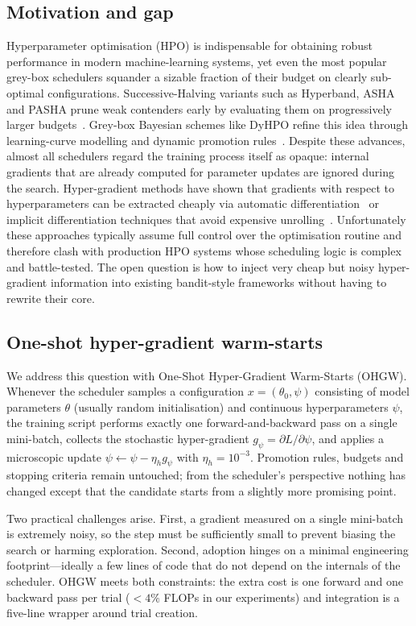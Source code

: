\documentclass{article} %
\begin{document}
\subsection{Motivation and gap}
Hyperparameter optimisation (HPO) is indispensable for obtaining robust performance in modern machine-learning systems, yet even the most popular grey-box schedulers squander a sizable fraction of their budget on clearly sub-optimal configurations. Successive-Halving variants such as Hyperband, ASHA and PASHA prune weak contenders early by evaluating them on progressively larger budgets~\cite{bohdal-2022-pasha}. Grey-box Bayesian schemes like DyHPO refine this idea through learning-curve modelling and dynamic promotion rules~\cite{wistuba-2022-supervising}. Despite these advances, almost all schedulers regard the training process itself as opaque: internal gradients that are already computed for parameter updates are ignored during the search. Hyper-gradient methods have shown that gradients with respect to hyperparameters can be extracted cheaply via automatic differentiation~\cite{chandra-2019-gradient} or implicit differentiation techniques that avoid expensive unrolling~\cite{bertrand-2020-implicit}. Unfortunately these approaches typically assume full control over the optimisation routine and therefore clash with production HPO systems whose scheduling logic is complex and battle-tested. The open question is how to inject very cheap but noisy hyper-gradient information into existing bandit-style frameworks without having to rewrite their core.

\subsection{One-shot hyper-gradient warm-starts}
We address this question with One-Shot Hyper-Gradient Warm-Starts (OHGW). Whenever the scheduler samples a configuration \(x=(\theta_0,\psi)\) consisting of model parameters \(\theta\) (usually random initialisation) and continuous hyperparameters \(\psi\), the training script performs exactly one forward-and-backward pass on a single mini-batch, collects the stochastic hyper-gradient \(g_{\psi}=\partial L/\partial \psi\), and applies a microscopic update \(\psi \leftarrow \psi - \eta_h g_{\psi}\) with \(\eta_h = 10^{-3}\). Promotion rules, budgets and stopping criteria remain untouched; from the scheduler's perspective nothing has changed except that the candidate starts from a slightly more promising point.

Two practical challenges arise. First, a gradient measured on a single mini-batch is extremely noisy, so the step must be sufficiently small to prevent biasing the search or harming exploration. Second, adoption hinges on a minimal engineering footprint---ideally a few lines of code that do not depend on the internals of the scheduler. OHGW meets both constraints: the extra cost is one forward and one backward pass per trial (\(<4\%\) FLOPs in our experiments) and integration is a five-line wrapper around trial creation.
\end{document}
